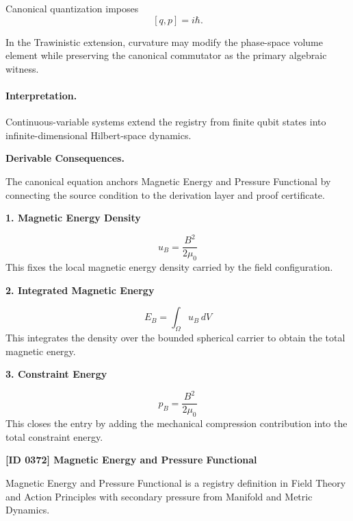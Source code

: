 Canonical quantization imposes
\begin{equation}
\boxed{
[q,p]=i\hbar .
}
\end{equation}

In the Trawinistic extension, curvature may modify the phase-space volume element while preserving the canonical commutator as the primary algebraic witness.

\paragraph{Interpretation.}
Continuous-variable systems extend the registry from finite qubit states into infinite-dimensional Hilbert-space dynamics.

\par\vspace{0.35em}
\noindent\textbf{Derivable Consequences.}\quad
\begingroup
\footnotesize
\raggedright
The canonical equation anchors Magnetic Energy and Pressure Functional by connecting the source condition to the derivation layer and proof certificate.
\par\endgroup

\noindent\textbf{1. Magnetic Energy Density}\par
\[
u_{B}=\frac{B^{2}}{2\mu_{0}}
\]
\noindent This fixes the local magnetic energy density carried by the field configuration.\par
\noindent\textbf{2. Integrated Magnetic Energy}\par
\[
E_{B}=\int_{\Omega}u_{B}\,dV
\]
\noindent This integrates the density over the bounded spherical carrier to obtain the total magnetic energy.\par
\noindent\textbf{3. Constraint Energy}\par
\[
p_{B}=\frac{B^{2}}{2\mu_{0}}
\]
\noindent This closes the entry by adding the mechanical compression contribution into the total constraint energy.\par

\clearpage
\noindent\textbf{[ID 0372] Magnetic Energy and Pressure Functional}\par
\vspace{0.35em}
\begingroup\small
{}
Magnetic Energy and Pressure Functional is a registry definition in Field Theory and Action Principles with secondary pressure from Manifold and Metric Dynamics.

